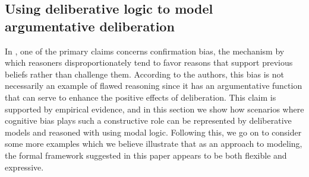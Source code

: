 \documentclass[greybox]{svmult}
\begin{document}
\subsection{Using deliberative logic to model argumentative deliberation}\label{sec:examples}

In \cite{mercier}, one of the primary claims concerns confirmation bias, the mechanism by which reasoners disproportionately tend to favor reasons that support previous beliefs rather than challenge them. According to the authors, this bias is not necessarily an example of flawed reasoning since it has an argumentative function that can serve to enhance the positive effects of deliberation. This claim is supported by empirical evidence, and in this section we show how scenarios where cognitive bias plays such a constructive role can be represented by deliberative models and reasoned with using modal logic. Following this, we go on to consider some more examples which we believe illustrate that as an approach to modeling, the formal framework suggested in this paper appears to be both flexible and expressive. 
\end{document}
